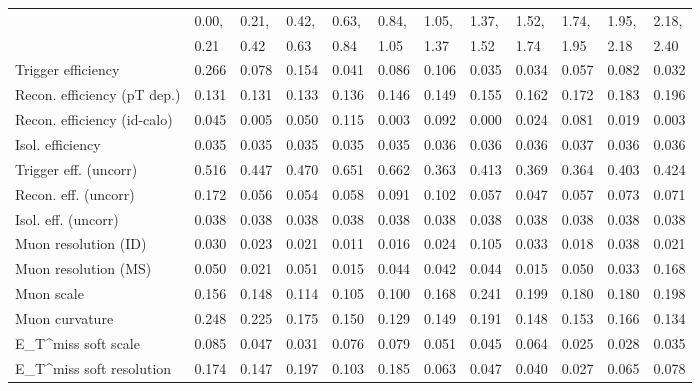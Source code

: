 \begin{tabular}{l|p{0.6cm}p{0.6cm}p{0.6cm}p{0.6cm}p{0.6cm}p{0.6cm}p{0.6cm}p{0.6cm}p{0.6cm}p{0.6cm}p{0.6cm}}
\hline
   & 0.00, & 0.21, & 0.42, & 0.63, & 0.84, & 1.05, & 1.37, & 1.52, & 1.74, & 1.95, & 2.18,  \\ 
   & 0.21 & 0.42 & 0.63 & 0.84 & 1.05 & 1.37 & 1.52 & 1.74 & 1.95 & 2.18 & 2.40  \\ 
\hline
Trigger efficiency                       & 0.266 & 0.078 & 0.154 & 0.041 & 0.086 & 0.106 & 0.035 & 0.034 & 0.057 & 0.082 & 0.032 \\
Recon. efficiency (pT dep.)              & 0.131 & 0.131 & 0.133 & 0.136 & 0.146 & 0.149 & 0.155 & 0.162 & 0.172 & 0.183 & 0.196 \\
Recon. efficiency (id-calo)              & 0.045 & 0.005 & 0.050 & 0.115 & 0.003 & 0.092 & 0.000 & 0.024 & 0.081 & 0.019 & 0.003 \\
Isol. efficiency                         & 0.035 & 0.035 & 0.035 & 0.035 & 0.035 & 0.036 & 0.036 & 0.036 & 0.037 & 0.036 & 0.036 \\
Trigger eff. (uncorr)                    & 0.516 & 0.447 & 0.470 & 0.651 & 0.662 & 0.363 & 0.413 & 0.369 & 0.364 & 0.403 & 0.424 \\
Recon. eff. (uncorr)                     & 0.172 & 0.056 & 0.054 & 0.058 & 0.091 & 0.102 & 0.057 & 0.047 & 0.057 & 0.073 & 0.071 \\
Isol. eff. (uncorr)                      & 0.038 & 0.038 & 0.038 & 0.038 & 0.038 & 0.038 & 0.038 & 0.038 & 0.038 & 0.038 & 0.038 \\
Muon resolution (ID)                     & 0.030 & 0.023 & 0.021 & 0.011 & 0.016 & 0.024 & 0.105 & 0.033 & 0.018 & 0.038 & 0.021 \\
Muon resolution (MS)                     & 0.050 & 0.021 & 0.051 & 0.015 & 0.044 & 0.042 & 0.044 & 0.015 & 0.050 & 0.033 & 0.168 \\
Muon scale                               & 0.156 & 0.148 & 0.114 & 0.105 & 0.100 & 0.168 & 0.241 & 0.199 & 0.180 & 0.180 & 0.198 \\
Muon curvature                           & 0.248 & 0.225 & 0.175 & 0.150 & 0.129 & 0.149 & 0.191 & 0.148 & 0.153 & 0.166 & 0.134 \\
E_{T}^{miss} soft scale                  & 0.085 & 0.047 & 0.031 & 0.076 & 0.079 & 0.051 & 0.045 & 0.064 & 0.025 & 0.028 & 0.035 \\
E_{T}^{miss} soft resolution             & 0.174 & 0.147 & 0.197 & 0.103 & 0.185 & 0.063 & 0.047 & 0.040 & 0.027 & 0.065 & 0.078 \\

\end{tabular}
